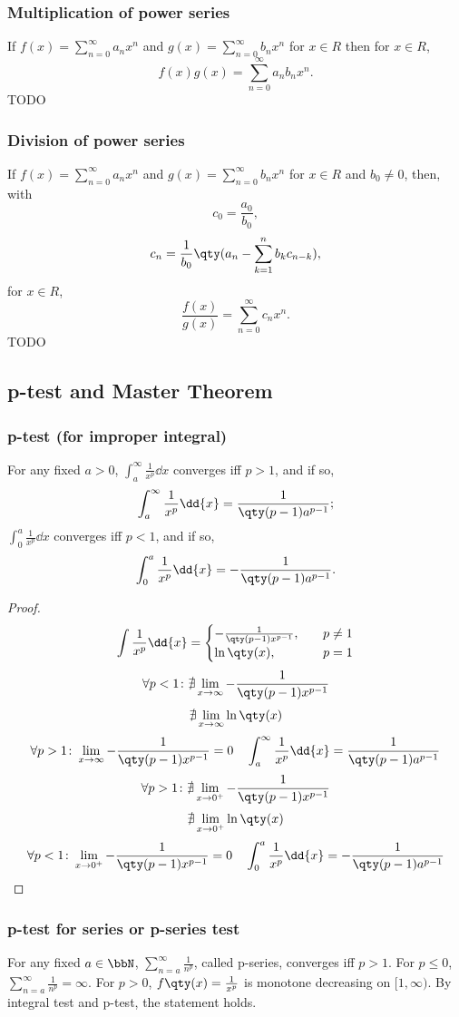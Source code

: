 \documentclass[a4paper,12pt]{report}
\begin{document}
\begin{itemize}
\begin{itemize}
\subsubsection{Multiplication of power series}
If $f(x)=\sum_{n=0}^{\infty}a_nx^n$ and $g(x)=\sum_{n=0}^{\infty}b_nx^n$ for $x\in R$ then for $x\in R$,
\[f(x)g(x)=\sum_{n=0}^{\infty}a_nb_nx^n.\]
\bpr
TODO
\epr
\subsubsection{Division of power series}
If $f(x)=\sum_{n=0}^{\infty}a_nx^n$ and $g(x)=\sum_{n=0}^{\infty}b_nx^n$ for $x\in R$ and $b_0\neq 0$, then, with
\[c_0=\frac{a_0}{b_0},\]
\[c_n=\frac{1}{b_0}\qty(a_n-\sum_{k=1}^nb_kc_{n-k}),\]
for $x\in R$,
\[\frac{f(x)}{g(x)}=\sum_{n=0}^{\infty}c_nx^n.\]
\bpr
TODO
\epr
\subsection{p-test and Master Theorem}
\subsubsection{p-test (for improper integral)}
For any fixed $a>0$, $\int_a^{\infty}\frac{1}{x^p}\dd{x}$ converges iff $p>1$, and if so,
\[\int_a^{\infty}\frac{1}{x^p}\dd{x}=\frac{1}{\qty(p-1)a^{p-1}};\]
$\int_0^a\frac{1}{x^p}\dd{x}$ converges iff $p<1$, and if so,
\[\int_0^a\frac{1}{x^p}\dd{x}=-\frac{1}{\qty(p-1)a^{p-1}}.\]
\begin{proof}
\[\int\frac{1}{x^p}\dd{x}=\begin{cases}
-\frac{1}{\qty(p-1)x^{p-1}},\quad&p\neq 1\\
\ln\qty(x),\quad&p=1
\end{cases}\]
\[\forall p<1\colon\nexists\lim_{x\to\infty}-\frac{1}{\qty(p-1)x^{p-1}}\]
\[\nexists\lim_{x\to\infty}\ln\qty(x)\]
\[\forall p>1\colon\lim_{x\to\infty}-\frac{1}{\qty(p-1)x^{p-1}}=0\quad\int_a^{\infty}\frac{1}{x^p}\dd{x}=\frac{1}{\qty(p-1)a^{p-1}}\]
\[\forall p>1\colon\nexists\lim_{x\to 0^+}-\frac{1}{\qty(p-1)x^{p-1}}\]
\[\nexists\lim_{x\to 0^+}\ln\qty(x)\]
\[\forall p<1\colon\lim_{x\to 0^+}-\frac{1}{\qty(p-1)x^{p-1}}=0\quad\int_0^a\frac{1}{x^p}\dd{x}=-\frac{1}{\qty(p-1)a^{p-1}}\]
\end{proof}
\subsubsection{p-test for series or p-series test}
For any fixed $a\in\bbN$, $\sum_{n=a}^{\infty}\frac{1}{n^p}$, called p-series, converges iff $p>1$.
\bpr
For $p\le0$, $\sum_{n=a}^{\infty}\frac{1}{n^p}=\infty$. For $p>0$, $f\qty(x)=\frac{1}{x^p}$ is monotone decreasing on $[1,\infty)$. By integral test and p-test, the statement holds.
\epr

\end{itemize}
\end{itemize}
\end{document}
